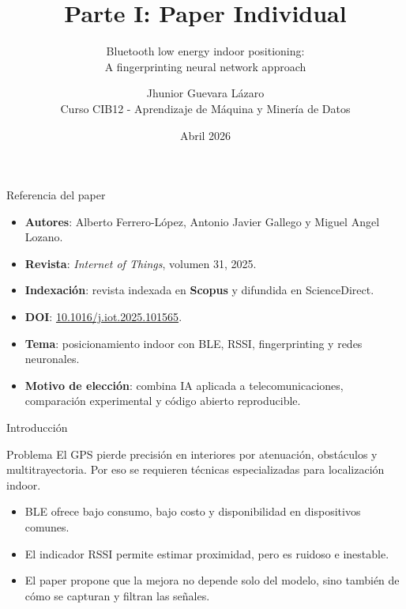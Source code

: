 \documentclass[aspectratio=169]{beamer}
\title{Parte I: Paper Individual}
\subtitle{Bluetooth low energy indoor positioning:\\A fingerprinting neural network approach}
\author{Jhunior Guevara Lázaro\\ Curso CIB12 - Aprendizaje de M\'aquina y Miner\'ia de Datos}
\institute{Laboratorio 02}
\date{Abril 2026}
\begin{document}
\begin{frame}
  \titlepage
\end{frame}

\begin{frame}{Referencia del paper}
  \begin{itemize}
    \item \textbf{Autores}: Alberto Ferrero-L\'opez, Antonio Javier Gallego y Miguel Angel Lozano.
    \item \textbf{Revista}: \textit{Internet of Things}, volumen 31, 2025.
    \item \textbf{Indexaci\'on}: revista indexada en \textbf{Scopus} y difundida en ScienceDirect.
    \item \textbf{DOI}: \href{https://doi.org/10.1016/j.iot.2025.101565}{10.1016/j.iot.2025.101565}.
    \item \textbf{Tema}: posicionamiento indoor con BLE, RSSI, fingerprinting y redes neuronales.
    \item \textbf{Motivo de elecci\'on}: combina IA aplicada a telecomunicaciones, comparaci\'on experimental y c\'odigo abierto reproducible.
  \end{itemize}
\end{frame}

\begin{frame}{Introducci\'on}
  \begin{block}{Problema}
    El GPS pierde precisi\'on en interiores por atenuaci\'on, obst\'aculos y multitrayectoria. Por eso se requieren t\'ecnicas especializadas para localizaci\'on indoor.
  \end{block}
  \begin{itemize}
    \item BLE ofrece bajo consumo, bajo costo y disponibilidad en dispositivos comunes.
    \item El indicador RSSI permite estimar proximidad, pero es ruidoso e inestable.
    \item El paper propone que la mejora no depende solo del modelo, sino tambi\'en de c\'omo se capturan y filtran las se\~nales.
  \end{itemize}
\end{frame}
\end{document}
